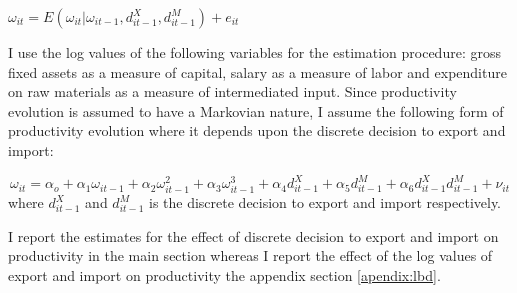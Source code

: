 \documentclass[12pt]{article}
\begin{document}
$\omega_{it} =
  E(\omega_{it}| \omega_{it-1}, d_{it-1}^{X}, d_{it-1}^{M}) + e_{it}$





I use the log values of the following variables for the estimation
procedure:  gross fixed assets as a measure of capital, salary
as a measure of labor and  expenditure on raw materials as a measure
of intermediated input. Since productivity evolution is  assumed to
have a Markovian nature, I assume the following form of productivity
evolution where it depends upon  the discrete decision to export and import:

\begin{equation}
 \omega_{it} = \alpha_{o} + \alpha_{1}\omega_{it-1} +
\alpha_{2}\omega_{it-1}^{2} + \alpha_{3}\omega_{it-1}^{3}+
\alpha_{4}d_{it-1}^{X} + \alpha_{5} d_{it-1}^{M} +
\alpha_{6}d_{it-1}^{X}d_{it-1}^{M}  + \nu_{it}
\end{equation} 
where $d_{it-1}^{X}$ and $d_{it-1}^{M}$ is the discrete decision to
export and import respectively. 

I report the estimates for the effect of discrete decision to export
and import on productivity in the main section whereas I report the
effect of the log values of export and import on productivity the
appendix section \ref{apendix:lbd}.  
\end{document}
